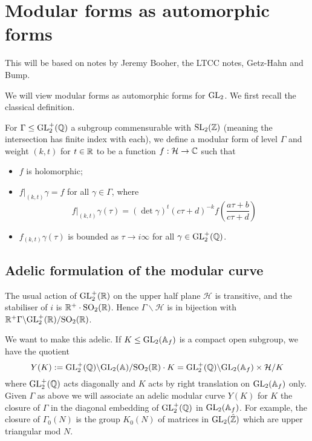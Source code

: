 \section{Modular forms as automorphic forms}

This will be based on notes by Jeremy Booher, the LTCC notes, Getz-Hahn and Bump.

We will view modular forms as automorphic forms for $\mathrm{GL}_2$. We first recall the classical definition.

\begin{defn}
    For $\Gamma \leq \mathrm{GL}_2^+ (\mathbb{Q})$ a subgroup commensurable with $\mathrm{SL}_2 (\mathbb{Z})$ (meaning the intersection has finite index with each), we define a modular form of level $\Gamma$ and weight $(k,t)$ for $t \in \mathbb{R}$ to be a function $f: \mathcal H \to \mathbb{C}$ such that
    \begin{itemize}
        \item $f$ is holomorphic;
        \item $f|_{(k,t)} \gamma = f$ for all $\gamma \in \Gamma$, where $$f|_{(k,t)} \gamma(\tau) = (\det \gamma)^t (c\tau+d)^{-k} f\left(\frac{a\tau+b }{c\tau +d}\right)$$
        \item $f_{(k,t)}\gamma(\tau)$ is bounded as $\tau \to i\infty$ for all $\gamma \in \mathrm{GL}_2^+ (\mathbb{Q})$.
    \end{itemize}
\end{defn}

\subsection{Adelic formulation of the modular curve}

The usual action of $\mathrm{GL}_2^+ (\mathbb{R})$ on the upper half plane $\mathcal H$ is transitive, and the stabiliser of $i$ is $\mathbb{R}^+ \cdot \mathrm{SO}_2(\mathbb{R})$. Hence $\Gamma \backslash \mathcal H$ is in bijection with $\mathbb{R}^+ \Gamma \backslash \mathrm{GL}_2^+ (\mathbb{R}) / \mathrm{SO}_2 (\mathbb{R})$.

We want to make this adelic. If $K \leq \mathrm{GL}_2(\mathbb{A}_f)$ is a compact open subgroup, we have the quotient
$$Y(K):= \mathrm{GL}_2^+(\mathbb{Q}) \backslash \mathrm{GL}_2(\mathbb{A})/ \mathrm{SO}_2(\mathbb{R})\cdot K = \mathrm{GL}_2^+ (\mathbb{Q}) \backslash \mathrm{GL}_2(\mathbb{A}_f) \times \mathcal H/ K$$ where $\mathrm{GL}_2^+(\mathbb{Q})$ acts diagonally and $K$ acts by right translation on $\mathrm{GL}_2(\mathbb{A}_f)$ only. Given $\Gamma$ as above we will associate an adelic modular curve $Y(K)$ for $K$ the closure of $\Gamma$ in the diagonal embedding of $\mathrm{GL}_2^+ (\mathbb{Q})$ in $\mathrm{GL}_2 (\mathbb{A}_f)$. For example, the closure of $\Gamma_0(N)$ is the group $K_0(N)$ of matrices in $\mathrm{GL}_2(\hat{\mathbb{Z}})$ which are upper triangular mod $N$.

